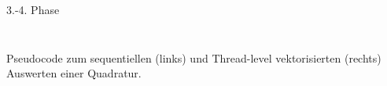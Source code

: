 \documentclass[10pt]{beamer}
\begin{document}
\begin{frame}{3.-4. Phase}
  \begin{columns}
      \begin{algorithm}[H]
        \begin{algorithmic}[1]
          \footnotesize
          {
          \EndFor{}
          }
        \end{algorithmic}
      \end{algorithm}
      \begin{algorithm}[H]
        \begin{algorithmic}[1]
          \footnotesize
          {
            \EndIf{}
          \EndFor{}
          }
        \end{algorithmic}
      \end{algorithm}
  \end{columns}
  \begin{center}
    Pseudocode zum sequentiellen (links) und Thread-level vektorisierten
    (rechts) Auswerten einer Quadratur.
  \end{center}
\end{frame}
\end{document}
